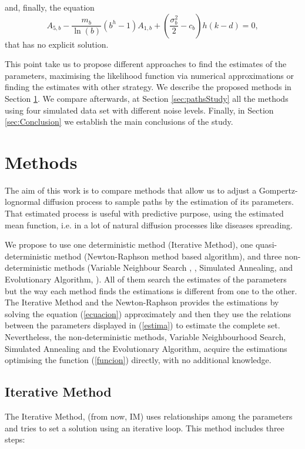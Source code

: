 \documentclass{sig-alternate}
\begin{document}
\noindent and, finally, the equation
\begin{equation}\label{ecuacion}
    A_{5,b}-\frac{m_b}{\ln(b)}(b^h-1)A_{1,b}+\left(\frac{\sigma_b^2}{2}-c_b\right)h(k-d)=0 ,
\end{equation}
that has no explicit solution.

This point take us to propose different approaches to find the estimates of the parameters, maximising the likelihood function via numerical approximations or finding the estimates with other strategy. We describe the proposed methods in Section \ref{sec:methods}. We compare afterwards, at Section \ref{sec:pathsStudy} all the methods using four simulated data set with different noise levels. Finally, in Section \ref{sec:Conclusion} we establish the main conclusions of the study.


\section{Methods}
\label{sec:methods}

The aim of this work is to compare methods that allow us to adjust a Gompertz-lognormal diffusion process to sample paths by the estimation of its parameters. That estimated process is useful with predictive purpose, using the estimated mean function, i.e. in a lot of natural diffusion processes like diseases spreading.

We propose to use one deterministic method (Iterative Method), one quasi-deterministic method (Newton-Raphson method based algorithm), and three non-deterministic methods (Variable Neighbour Search , \cite{VNS}, Simulated Annealing, \cite{SA} and Evolutionary Algorithm, \cite{EA}). All of them search the estimates of the parameters but the way each method finds the estimations is different from one to the other. The Iterative Method and the Newton-Raphson  provides the estimations by solving the equation (\ref{ecuacion}) approximately and then they use the relations between the parameters displayed in (\ref{estima}) to estimate the complete set. Nevertheless, the non-deterministic methods, Variable Neighbourhood Search, Simulated Annealing and the Evolutionary Algorithm, acquire the estimations optimising the function (\ref{funcion}) directly, with no additional knowledge.


\subsection{Iterative Method}
\label{subsec:iterative}
The Iterative Method, (from now, IM) uses relationships among the parameters and tries to set a solution using an iterative loop.  This method includes three steps:
\end{document}
